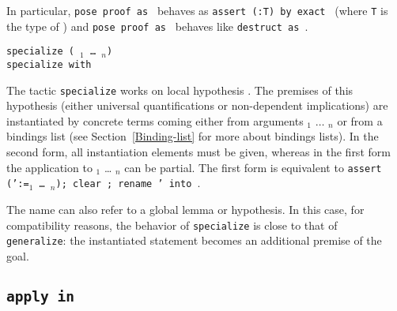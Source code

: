\begin{Variants}
  In particular, \texttt{pose proof {\term} as {\ident}} behaves as
  \texttt{assert ({\ident}:T) by exact {\term}} (where \texttt{T} is
  the type of {\term}) and \texttt{pose proof {\term} as
  {\disjconjintropattern}} behaves
  like \texttt{destruct {\term} as {\disjconjintropattern}}.

\item {\tt specialize ({\ident} \term$_1$ {\ldots} \term$_n$)} \\
      {\tt specialize {\ident} with \bindinglist}

      The tactic {\tt specialize} works on local hypothesis \ident.
      The premises of this hypothesis (either universal
      quantifications or non-dependent implications) are instantiated
      by concrete terms coming either from arguments \term$_1$
      $\ldots$ \term$_n$ or from a bindings list (see
      Section~\ref{Binding-list} for more about bindings lists). In the
      second form, all instantiation elements must be given, whereas
      in the first form the application to \term$_1$ {\ldots}
      \term$_n$ can be partial. The first form is equivalent to 
      {\tt assert (\ident':=\ident \term$_1$ {\ldots} \term$_n$);
           clear \ident; rename \ident' into \ident}. 

      The name {\ident} can also refer to a global lemma or
      hypothesis. In this case, for compatibility reasons, the
      behavior of {\tt specialize} is close to that of {\tt
        generalize}: the instantiated statement becomes an additional 
      premise of the goal. 


\end{Variants}

\subsection{{\tt apply {\term} in {\ident}}
}

